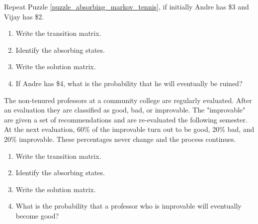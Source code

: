 \begin{puzzle}
    Repeat Puzzle \ref{puzzle_absorbing_markov_tennis}, if initially Andre has \$3 and Vijay has \$2.
    \begin{enumerate}
        \item Write the transition matrix.
        \item Identify the absorbing states.
        \item Write the solution matrix.
        \item If Andre has \$4, what is the probability that he will eventually be ruined?
    \end{enumerate}
\end{puzzle}

\begin{puzzle}
    The non-tenured professors at a community college are regularly evaluated. After an evaluation they are classified as good, bad, or improvable. The "improvable" are given a set of recommendations and are re-evaluated the following semester. At the next evaluation, 60\% of the improvable turn out to be good, 20\% bad, and 20\% improvable. These percentages never change and the process continues.
    \begin{enumerate}
        \item Write the transition matrix.
        \item Identify the absorbing states.
        \item Write the solution matrix.
        \item What is the probability that a professor who is improvable will eventually become good?
    \end{enumerate}
\end{puzzle}

